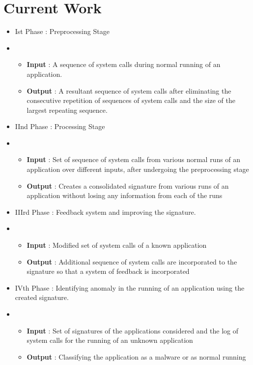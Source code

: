 \chapter{Current Work}

\begin{itemize}
    \item[] Ist Phase : Preprocessing Stage
    \item[] \begin{itemize}
                \item[] \textbf{Input}    : A sequence of system calls during normal running of an application. 
                \item[] \textbf{Output} : A resultant sequence of system calls after eliminating the consecutive repetition of sequences of system calls and the size of the largest repeating sequence.
            \end{itemize}
    \item[] IInd Phase : Processing Stage
    \item[] \begin{itemize}
                \item[] \textbf{Input}    : Set of sequence of system calls from various normal runs of an application over different inputs, after undergoing the preprocessing stage
                \item[] \textbf{Output} : Creates a consolidated signature from various runs of an application without losing any information from each of the runs
            \end{itemize}

    \item[] IIIrd Phase : Feedback system and improving the signature.
    \item[] \begin{itemize}
                \item[] \textbf{Input}    : Modified set of system calls of a known application
                \item[] \textbf{Output} : Additional sequence of system calls are incorporated to the signature so that a system of feedback is incorporated
            \end{itemize}

    \item[] IVth Phase : Identifying anomaly in the running of an application using the created signature.
    \item[] \begin{itemize}
                \item[] \textbf{Input} : Set of signatures of the applications considered and the log of system calls for the running of an unknown application
                \item[] \textbf{Output} : Classifying the application as a malware or as normal running
            \end{itemize}
\end{itemize}
